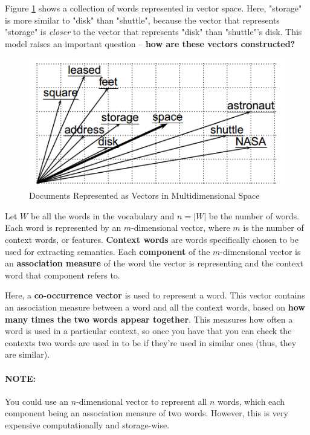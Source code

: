 \documentclass{article}
\begin{document}
Figure \ref{fig:vsm-similar} shows a collection of words represented in vector space. Here, "storage" is more similar to "disk" than "shuttle", because the vector that represents "storage" is \textit{closer} to the vector that represents "disk" than "shuttle"'s disk. This model raises an important question -- \textbf{how are these vectors constructed?}

\begin{figure}
	\centering
	\includegraphics[scale=0.6]{figures/vector-space-model.png}
	\caption{Documents Represented as Vectors in Multidimensional Space}
	\label{fig:vsm-similar}
\end{figure}

Let $W$ be all the words in the vocabulary and $n = |W|$ be the number of words. Each word is represented by an $m$-dimensional vector, where $m$ is the number of context words, or features. \textbf{Context words} are words specifically chosen to be used for extracting semantics.  Each \textbf{component} of the $m$-dimensional vector is an \textbf{association measure} of the word the vector is representing and the context word that component refers to. 

Here, a \textbf{co-occurrence vector} is used to represent a word. This vector contains an association measure between a word and all the context words, based on \textbf{how many times the two words appear together}. This measures how often a word is used in a particular context, so once you have that you can check the contexts two words are used in to be if they're used in similar ones (thus, they are similar).

\paragraph{\textbf{NOTE:} } You could use an $n$-dimensional vector to represent all $n$ words, which each component being an association measure of two words. However, this is very expensive computationally and storage-wise.
\end{document}
